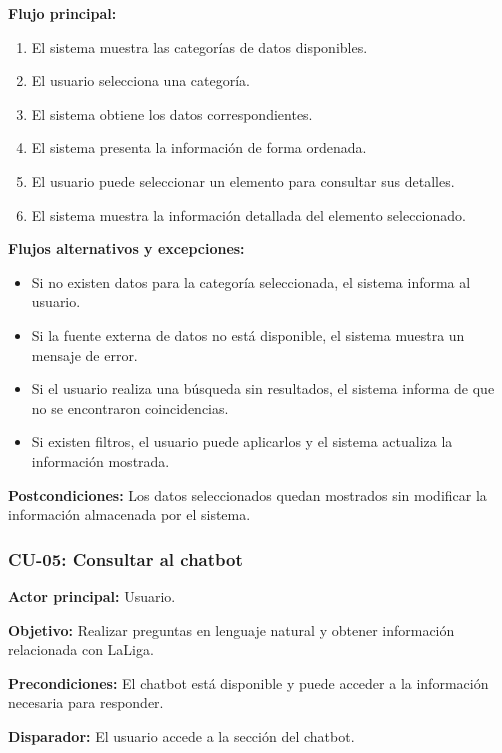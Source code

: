 \noindent \textbf{Flujo principal:}
\begin{enumerate}
    \item El sistema muestra las categorías de datos disponibles.
    \item El usuario selecciona una categoría.
    \item El sistema obtiene los datos correspondientes.
    \item El sistema presenta la información de forma ordenada.
    \item El usuario puede seleccionar un elemento para consultar sus detalles.
    \item El sistema muestra la información detallada del elemento seleccionado.
\end{enumerate}

\noindent \textbf{Flujos alternativos y excepciones:}
\begin{itemize}
    \item Si no existen datos para la categoría seleccionada, el sistema informa al usuario.
    \item Si la fuente externa de datos no está disponible, el sistema muestra un mensaje de error.
    \item Si el usuario realiza una búsqueda sin resultados, el sistema informa de que no se encontraron coincidencias.
    \item Si existen filtros, el usuario puede aplicarlos y el sistema actualiza la información mostrada.
\end{itemize}

\noindent \textbf{Postcondiciones:} Los datos seleccionados quedan mostrados sin modificar la información almacenada por el sistema.

\subsubsection{CU-05: Consultar al chatbot}

\noindent \textbf{Actor principal:} Usuario.

\noindent \textbf{Objetivo:} Realizar preguntas en lenguaje natural y obtener información relacionada con LaLiga.

\noindent \textbf{Precondiciones:} El chatbot está disponible y puede acceder a la información necesaria para responder.

\noindent \textbf{Disparador:} El usuario accede a la sección del chatbot.

